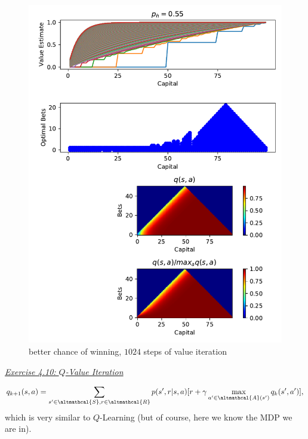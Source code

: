 \documentclass{article}
\newcommand{\myq}[1]{%
	\vspace{1em}
	\noindent\underline{\emph{Exercise #1}}\vspace{0.25em}\linebreak
}
\begin{document}
\begin{figure}
	\includegraphics[width=\textwidth]{less_unfair_even_more_runs}
	\centering
	\caption{\label{fig:less_unfair_even_more_runs}better chance of winning, $1024$ steps of value iteration}
\end{figure} 

\myq{4.10: $Q$-Value Iteration}
\begin{align}
q_{k+1}(s, a) = \sum_{s' \in \altmathcal{S}, r \in \altmathcal{R}} p(s', r | s, a)[r + \gamma \max_{a' \in \altmathcal{A}(s')} q_k(s', a') ],
\end{align}
which is very similar to $Q$-Learning (but of course, here we know the MDP we are in). 
\end{document}
